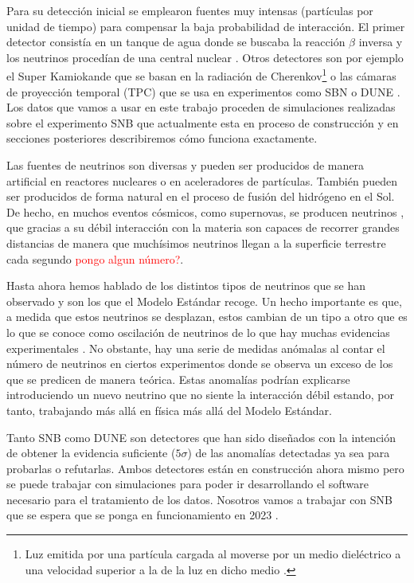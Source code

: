 \documentclass[a4paper,12pt,twoside,titlepage]{article}
\newcommand{\red}[1]{\textcolor{red}{#1}}
\begin{document}
Para su detección inicial se emplearon fuentes muy intensas (partículas por unidad de tiempo) para compensar la baja probabilidad de interacción. El primer detector consistía en un tanque de agua donde se buscaba la reacción $\beta$ inversa y los neutrinos procedían de una central nuclear \cite{particle_griff}. Otros detectores son por ejemplo el Super Kamiokande \cite{kamiokande} que se basan en la radiación de Cherenkov\footnote{Luz emitida por una partícula cargada al moverse por un medio dieléctrico a una velocidad superior a la de la luz en dicho medio \cite{jackson}.} o las cámaras de proyección temporal (TPC) que se usa en experimentos como SBN \cite{sbnd} o DUNE \cite{dune}. Los datos que vamos a usar en este trabajo proceden de simulaciones realizadas sobre el experimento SNB que actualmente esta en proceso de construcción y en secciones posteriores describiremos cómo funciona exactamente.

Las fuentes de neutrinos son diversas y pueden ser producidos de manera artificial en reactores nucleares o en aceleradores de partículas. También pueden ser producidos de forma natural en el proceso de fusión del hidrógeno en el Sol. De hecho, en muchos eventos cósmicos, como supernovas, se producen neutrinos \cite{supernova}, que gracias a su débil interacción con la materia son capaces de recorrer grandes distancias de manera que muchísimos neutrinos llegan a la superficie terrestre cada segundo \red{pongo algun número?}.

Hasta ahora hemos hablado de los distintos tipos de neutrinos que se han observado y son los que el Modelo Estándar recoge. Un hecho importante es que, a medida que estos neutrinos se desplazan, estos cambian de un tipo a otro que es lo que se conoce como oscilación de neutrinos de lo que hay muchas evidencias experimentales \cite{oscilation}. No obstante, hay una serie de medidas anómalas al contar el número de neutrinos en ciertos experimentos donde se observa un exceso de los que se predicen de manera teórica. Estas anomalías podrían explicarse introduciendo un nuevo neutrino que no siente la interacción débil \cite{sbnd} estando, por tanto, trabajando más allá en física más allá del Modelo Estándar.

Tanto SNB como DUNE son detectores que han sido diseñados con la intención de obtener la evidencia suficiente ($5\sigma$) de las anomalías detectadas ya sea para probarlas o refutarlas. Ambos detectores están en construcción ahora mismo pero se puede trabajar con simulaciones para poder ir desarrollando el software necesario para el tratamiento de los datos. Nosotros vamos a trabajar con SNB que se espera que se ponga en funcionamiento en 2023 \cite{sbnd_page}.
\end{document}
